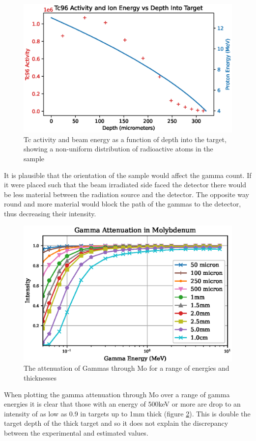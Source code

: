 \begin{figure}[htb]
\centering
\includegraphics[width=0.7\linewidth]{chapters/activity_code/mo-john-hewett/mo96_pn_tc96_activity_depth.eps}
\caption{\Gls{Tc} activity and beam energy as a function of depth into the target, showing a non-uniform distribution of radioactive atoms in the sample}
\label{fig:mo96tc96activitydepth}
\end{figure}

It is plausible that the orientation of the sample would affect the gamma count.  If it were placed such that the beam irradiated side faced the detector there would be less material between the radiation source and the detector.  The opposite way round and more material would block the path of the gammas to the detector, thus decreasing their intensity.

\begin{figure}[htb]
\centering
\includegraphics[width=0.7\linewidth]{chapters/activity_code/mo-john-hewett/attenuation/mo_gamma_attenuation.eps}
\caption{The attenuation of Gammas through \Gls{Mo} for a range of energies and thicknesses\cite{massattenuation}}
\label{fig:moattenuation}
\end{figure}

When plotting the gamma attenuation through \Gls{Mo} over a range of gamma energies it is clear that those with an energy of 500keV or more are drop to an intensity of as low as 0.9 in targets up to 1mm thick (figure \ref{fig:moattenuation})\cite{massattenuation}.  This is double the target depth of the thick target and so it does not explain the discrepancy between the experimental and estimated values.



